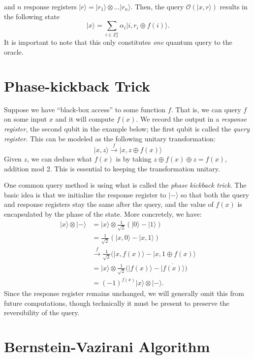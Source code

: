 \documentclass[12pt,twoside]{reedthesis}
\theoremstyle{definition}
\newcommand{\Z}{\mathbb{Z}}
\newcommand{\ketz}{\ensuremath{\lvert 0\rangle}\xspace}
\newcommand{\keto}{\ensuremath{\lvert 1\rangle}\xspace}
\newcommand{\ket}[1]{\ensuremath{\lvert #1\rangle}\xspace}
\newcommand{\Hminus}{\ensuremath{\lvert- \rangle}\xspace}
\begin{document}
and $n$ response registers $\ket{r} = \ket{r_1} \otimes \ldots \ket{r_n}$. Then, the query $\mathcal{O}(\ket{x, r})$ results in the following state
\begin{equation*}
\ket{x} = \sum_{i \in \Z_2^n} \alpha_i \ket{i, r_i \oplus f(i)}.
\end{equation*}
It is important to note that this only constitutes \textit{one} quantum query to the oracle.


\section{Phase-kickback Trick}

Suppose we have ``black-box access'' to some function $f$. That is, we can query $f$ on some input $x$ and it will compute $f(x)$. We record the output in a \textit{response register}, the second qubit in the example below; the first qubit is called the \textit{query register}. This can be modeled as the following unitary transformation:
\begin{equation*}
\ket{x, z} \xrightarrow{f} \ket{x, z \oplus f(x)}
\end{equation*}
Given $z$, we can deduce what $f(x)$ is by taking $z \oplus f(x) \oplus z = f(x)$, addition mod 2. This is essential to keeping the transformation unitary. 

One common query method is using what is called the \textit{phase kickback trick}. The basic idea is that we initialize the response register to \Hminus so that both the query and response registers stay the same after the query, and the value of $f(x)$ is encapsulated by the phase of the state. More concretely, we have:
\begin{align*}
\ket{x} \otimes \Hminus 
& = \ket{x} \otimes \frac{1}{\sqrt{2}}(\ketz - \keto)\\
& = \frac{1}{\sqrt{2}}(\ket{x, 0} - \ket{x, 1}) \\
& \xrightarrow{f} \frac{1}{\sqrt{2}}(\ket{x, f(x)} - \ket{x, 1 \oplus f(x)} \\
& = \ket{x} \otimes \frac{1}{\sqrt{2}}\bigg(\ket{f(x)} - \ket{\overline{f(x)}}\bigg) \\
& = (-1)^{f(x)} \ket{x} \otimes \ket{ -}.
\end{align*}
Since the response register remains unchanged, we will generally omit this from future computations, though technically it must be present to preserve the reversibility of the query. 
\section{Bernstein-Vazirani Algorithm}
\end{document}
